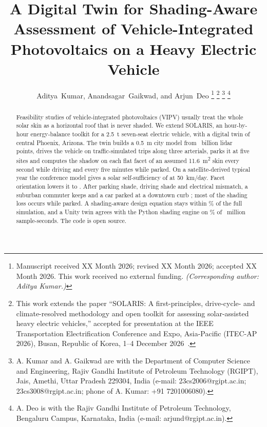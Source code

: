 \documentclass[lettersize,journal]{IEEEtran}
\begin{document}
\title{A Digital Twin for Shading-Aware Assessment of Vehicle-Integrated Photovoltaics on a Heavy Electric Vehicle}

\author{Aditya~Kumar, Anandsagar~Gaikwad, and Arjun~Deo%
\thanks{Manuscript received XX Month 2026; revised XX Month 2026; accepted XX Month 2026. This work received no external funding. \emph{(Corresponding author: Aditya Kumar.)}}%
\thanks{This work extends the paper ``SOLARIS: A first-principles, drive-cycle- and climate-resolved methodology and open toolkit for assessing solar-assisted heavy electric vehicles,'' accepted for presentation at the IEEE Transportation Electrification Conference and Expo, Asia-Pacific (ITEC-AP 2026), Busan, Republic of Korea, 1--4 December 2026~\cite{ref_conf}.}%
\thanks{A. Kumar and A. Gaikwad are with the Department of Computer Science and Engineering, Rajiv Gandhi Institute of Petroleum Technology (RGIPT), Jais, Amethi, Uttar Pradesh 229304, India (e-mail: 23cs2006@rgipt.ac.in; 23cs3008@rgipt.ac.in; phone of A. Kumar: +91 7201006080).}%
\thanks{A. Deo is with the Rajiv Gandhi Institute of Petroleum Technology, Bengaluru Campus, Karnataka, India (e-mail: arjund@rgipt.ac.in).}}

\maketitle
\thispagestyle{empty}
\pagestyle{empty}

\begin{abstract}
Feasibility studies of vehicle-integrated photovoltaics (VIPV) usually treat the whole solar skin as a horizontal roof that is never shaded. We extend SOLARIS, an hour-by-hour energy-balance toolkit for a \SI{2.5}{t} seven-seat electric vehicle, with a digital twin of central Phoenix, Arizona. The twin builds a \SI{0.5}{m} city model from \GeoPoints~billion lidar points, drives the vehicle on traffic-simulated trips along three arterials, parks it at five sites and computes the shadow on each flat facet of an assumed \SI{11.6}{m^2} skin every second while driving and every five minutes while parked. On a satellite-derived typical year the conference model gives a solar self-sufficiency of \BzPhxIIfss{} at \SI{50}{km/day}. Facet orientation lowers it to \EfiveAOneFacets. After parking shade, driving shade and electrical mismatch, a suburban commuter keeps \EfiveAOneMismatch{} and a car parked at a downtown curb \EfiveATwoMismatch; most of the shading loss occurs while parked. A shading-aware design equation stays within \EsevenMaxErr\% of the full simulation, and a Unity twin agrees with the Python shading engine on \EeightAgree\% of \EeightRecords~million sample-seconds. The code is open source.
\end{abstract}
\end{document}
